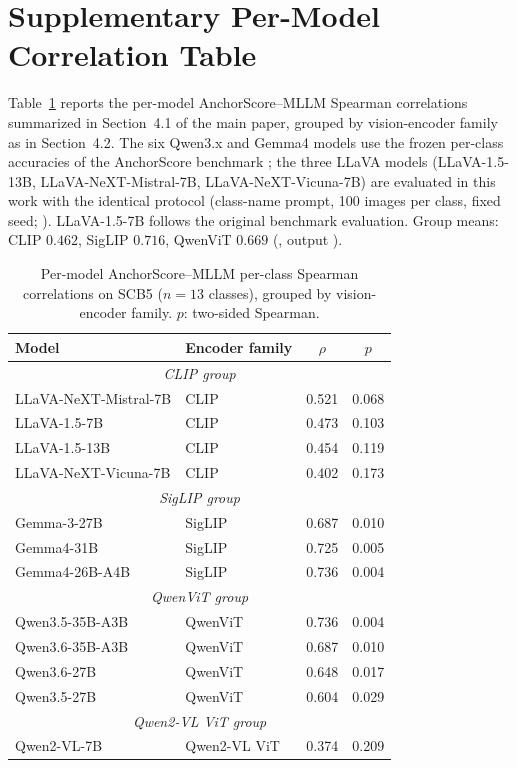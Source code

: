 \documentclass[11pt,a4paper]{article}
\begin{document}
\section*{Supplementary Per-Model Correlation Table}
\label{sec:per_model_table}

Table~\ref{tab:per_model_rho} reports the per-model AnchorScore--MLLM Spearman correlations summarized in Section~4.1 of the main paper, grouped by vision-encoder family as in Section~4.2. The six Qwen3.x and Gemma4 models use the frozen per-class accuracies of the AnchorScore benchmark \cite{la}; the three LLaVA models (LLaVA-1.5-13B, LLaVA-NeXT-Mistral-7B, LLaVA-NeXT-Vicuna-7B) are evaluated in this work with the identical protocol (class-name prompt, 100 images per class, fixed seed; ). LLaVA-1.5-7B follows the original benchmark evaluation. Group means: CLIP $0.462$, SigLIP $0.716$, QwenViT $0.669$ (, output ).

\begin{table}[H]
\centering
\caption{Per-model AnchorScore--MLLM per-class Spearman correlations on SCB5 ($n=13$ classes), grouped by vision-encoder family. $p$: two-sided Spearman.}
\label{tab:per_model_rho}
\small
\begin{tabular}{llcc}
\toprule
Model & Encoder family & $\rho$ & $p$ \\
\midrule
\multicolumn{4}{c}{\textit{CLIP group}} \\
\midrule
LLaVA-NeXT-Mistral-7B & CLIP & 0.521 & 0.068 \\
LLaVA-1.5-7B & CLIP & 0.473 & 0.103 \\
LLaVA-1.5-13B & CLIP & 0.454 & 0.119 \\
LLaVA-NeXT-Vicuna-7B & CLIP & 0.402 & 0.173 \\
\midrule
\multicolumn{4}{c}{\textit{SigLIP group}} \\
\midrule
Gemma-3-27B & SigLIP & 0.687 & 0.010 \\
Gemma4-31B & SigLIP & 0.725 & 0.005 \\
Gemma4-26B-A4B & SigLIP & 0.736 & 0.004 \\
\midrule
\multicolumn{4}{c}{\textit{QwenViT group}} \\
\midrule
Qwen3.5-35B-A3B & QwenViT & 0.736 & 0.004 \\
Qwen3.6-35B-A3B & QwenViT & 0.687 & 0.010 \\
Qwen3.6-27B & QwenViT & 0.648 & 0.017 \\
Qwen3.5-27B & QwenViT & 0.604 & 0.029 \\
\midrule
\multicolumn{4}{c}{\textit{Qwen2-VL ViT group}} \\
\midrule
Qwen2-VL-7B & Qwen2-VL ViT & 0.374 & 0.209 \\
\bottomrule
\end{tabular}
\end{table}
\end{document}

